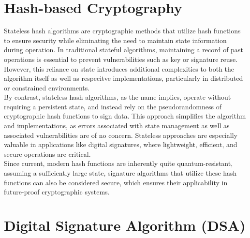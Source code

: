\documentclass[journal=tosc,notanonymous]{iacrtrans}
\begin{document}
\section{Hash-based Cryptography}

Stateless hash algorithms are cryptographic methods that utilize hash functions to ensure security while eliminating the need to maintain state information during operation.
In traditional stateful algorithms, maintaining a record of past operations is essential to prevent vulnerabilities such as key or signature reuse.
However, this reliance on state introduces additional complexities to both the algorithm itself as well as respecitve implementations, particularly in distributed or constrained environments.
\\
By contrast, stateless hash algorithms, as the name implies, operate without requiring a persistent state, and instead rely on the pseudorandomness of cryptographic hash functions to sign data.
This approach simplifies the algorithm and implementations, as errors associated with state management as well as associated vulnerabilities are of no concern.
Stateless approaches are especially valuable in applications like digital signatures, where lightweight, efficient, and secure operations are critical.
\\
Since current, modern hash functions are inherently quite quantum-resistant, assuming a sufficiently large state, signature algorithms that utilize these hash functions can also be considered secure, which ensures their applicability in future-proof cryptographic systems.

\section{Digital Signature Algorithm (DSA)}
\end{document}
